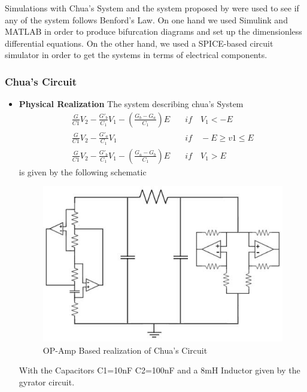 Simulations with Chua's System and the system proposed by \cite{Takougang13} were used to see if any of the system follows Benford's Law. On one hand we used Simulink and MATLAB in order to produce bifurcation diagrams and set up the dimensionless differential equations. On the other hand, we used a SPICE-based circuit simulator in order to get the systems in terms of electrical components.

\subsubsection{Chua's Circuit}
 \begin{itemize}
   \item \textbf{Physical Realization}
 The system describing chua's System
\begin{align*}
\frac{G}{C1}V_2-\frac{G'_b}{C_1}V_1-(\frac{G_b-G_a}{C_1})E &\quad if \quad V_1< -E\\
\frac{G}{C1}V_2-\frac{G'_a}{C_1}V_1 &\quad if \quad -E\geq v1 \leq E\\
\frac{G}{C1}V_2-\frac{G'_b}{C_1}V_1-(\frac{G_a-G_b}{C_1})E &\quad if \quad V_1>E
\end{align*}
is given by the following schematic
            \begin{figure}[H]
            \centering
            \includegraphics[scale=0.4]{imagenes/2-benford/chuas_circuit_realized.jpg}
            \caption{OP-Amp Based realization of Chua's Circuit}
            \end{figure}

With the Capacitors
C1=10nF
C2=100nF
and a 8mH Inductor given by the gyrator circuit.


\end{itemize}
